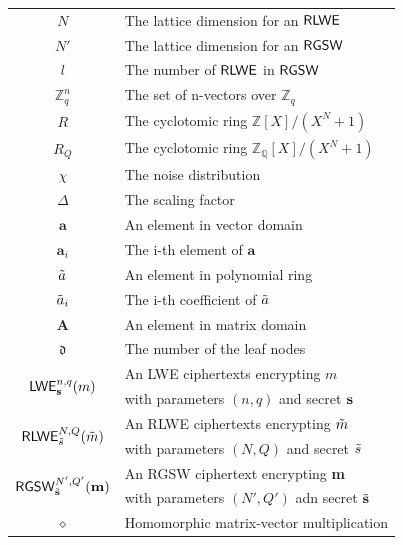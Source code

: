 \begin{table}[t!]
\begin{center}
\begin{tabular}{c|l}
        $N$       & The lattice dimension for an ${\mathsf{RLWE}}$\\
        $N'$       & The lattice dimension for an ${\mathsf{RGSW}}$\\
        $l$       & The number of ${\mathsf{RLWE}}$ in ${\mathsf{RGSW}}$ \\
        $\mathbb{Z}_{q}^{n}$ & The set of n-vectors over $\mathbb{Z}_q$ \\
        $R$ & The cyclotomic ring   $\mathbb{Z}[X]/(X^N+1)$\\
        $R_{Q} $ & The cyclotomic ring $\mathbb{Z_{Q}}[X]/(X^N+1)$ \\
        $\chi$ & The noise distribution \\
        $\Delta$ & The scaling factor \\
        $\mathbf{a}$ & An element in vector domain \\
        $\mathbf{a}_i$ & The i-th element of $\mathbf{a}$ \\
        $ \Tilde{a} $ & An element in polynomial ring \\
        $ \Tilde{a}_i $ & The i-th coefficient of $\Tilde{a}$ \\
        $ \mathbf{A} $ & An element in matrix domain \\
        $\mathfrak{d} $ & The number of the leaf nodes\\
        \midrule
        \multirow{2}{*}{$ {\mathsf{LWE}}^{n, q}_{{\mathbf{s}}}(m) $} & An LWE ciphertexts encrypting $m$ \\
        & with parameters $(n, q)$ and secret ${\mathbf{s}}$\\
        \multirow{2}{*}{$ {\mathsf{RLWE}}^{N, Q}_{{\Tilde{s}}}({\Tilde{m}}) $} & An RLWE ciphertexts encrypting ${\Tilde{m}}$ \\
        & with parameters $(N, Q)$ and secret ${\Tilde{s}}$\\
        \multirow{2}{*}{$ {\mathsf{RGSW}}^{N', Q'}_{\Tilde{{\mathbf{s}}}}({\bf{m}})$} & An RGSW ciphertext encrypting
        {\bf{m}} \\
        & with parameters $(N', Q')$ adn secret $\Tilde{{\mathbf{s}}}$ \\
        $\diamond $ & Homomorphic matrix-vector multiplication\\

\end{tabular}
\end{center}
\end{table}
